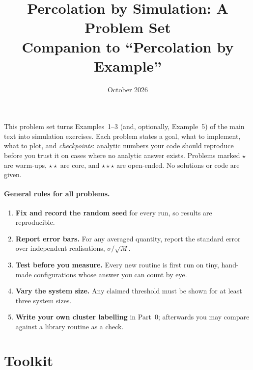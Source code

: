 \documentclass[11pt]{article}
\title{\textbf{Percolation by Simulation: A Problem Set}\\[2pt]
\large Companion to ``Percolation by Example''}
\author{}
\date{October 2026}
\newcounter{prob}[section]
\renewcommand{\thesection}{\Alph{section}}
\begin{document}
\maketitle

\noindent This problem set turns Examples~1--3 (and, optionally, Example~5) of the main text into simulation exercises. Each problem states a goal, what to implement, what to plot, and \emph{checkpoints}: analytic numbers your code should reproduce before you trust it on cases where no analytic answer exists. Problems marked {\small$\star$} are warm-ups, {\small$\star\star$} are core, and {\small$\star\star\star$} are open-ended. No solutions or code are given.

\paragraph{General rules for all problems.}
\begin{enumerate}[leftmargin=*,itemsep=1pt]
\item \textbf{Fix and record the random seed} for every run, so results are reproducible.
\item \textbf{Report error bars.} For any averaged quantity, report the standard error over independent realisations, $\sigma/\sqrt{M}$.
\item \textbf{Test before you measure.} Every new routine is first run on tiny, hand-made configurations whose answer you can count by eye.
\item \textbf{Vary the system size.} Any claimed threshold must be shown for at least three system sizes.
\item \textbf{Write your own cluster labelling} in Part~0; afterwards you may compare against a library routine as a check.
\end{enumerate}

\setcounter{section}{-1}
\renewcommand{\thesection}{\arabic{section}}
\section{Toolkit}
\end{document}
